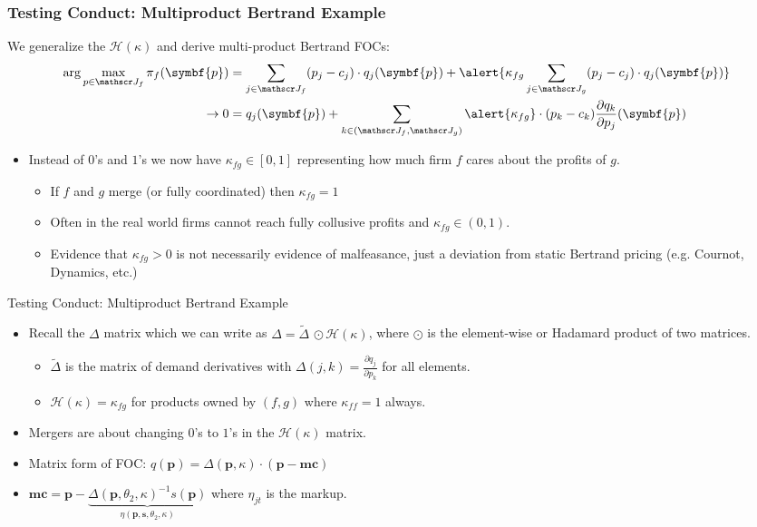 \documentclass[aspectratio=169,10pt]{beamer}
\begin{document}
\begin{frame}
\frametitle{Testing Conduct: Multiproduct Bertrand Example}
\small
We generalize the $\mathcal{H}(\kappa)$ and derive multi-product Bertrand FOCs:
\begin{align*}
\arg \max_{p \in \calJ_f} \pi_f (\symbf{p}) &= \sum_{j \in \calJ_f} (p_j - c_j) \cdot q_j(\symbf{p}) +  \alert{\kappa_{fg} \sum_{j \in \calJ_g} (p_j - c_j) \cdot q_j(\symbf{p})} \\
\rightarrow 0&= q_j(\symbf{p}) + \sum_{k \in (\calJ_f,\calJ_g)} \alert{\kappa_{fg}}\cdot (p_k - c_k) \frac{\partial q_{k}}{\partial p_j}(\symbf{p}) 
\end{align*}
\begin{itemize}
\item Instead of $0$'s and $1$'s we now have $\kappa_{fg} \in [0,1]$ representing how much firm $f$ cares about the profits of $g$.
\begin{itemize}
\item If $f$ and $g$ merge (or fully coordinated) then $\kappa_{fg} =1$
\item Often in the real world firms cannot reach fully collusive profits and $\kappa_{fg} \in (0,1)$.
\item Evidence that $\kappa_{fg} > 0$ is not necessarily evidence of malfeasance, just a deviation from \alert{static Bertrand pricing} (e.g. Cournot, Dynamics, etc.)
\end{itemize}
\end{itemize}
\end{frame}


\begin{frame}{Testing Conduct: Multiproduct Bertrand Example}
\begin{itemize}
\item Recall the $\Delta$ matrix which we can write as $\Delta=\tilde{\Delta}\, \odot \mathcal{H}(\kappa)$, where $\odot$ is the element-wise or Hadamard product of two matrices. 
\begin{itemize}
\item $\tilde{\Delta}$ is the matrix of demand derivatives with $\Delta{(j,k)} = \frac{\partial q_j}{\partial p_k}$ for all elements.
\item $\mathcal{H}(\kappa)=\kappa_{fg}$ for products owned by $(f,g)$ where $\kappa_{ff}=1$ always.
\end{itemize}
\item Mergers are about changing $0$'s to $1$'s in the $\mathcal{H}(\kappa)$ matrix.
\item Matrix form of FOC: $q(\symbf{p}) = \Delta(\symbf{p},\kappa)\cdot(\symbf{p}-\symbf{mc})$
\item $\symbf{mc} =  \symbf{p} - \underbrace{\Delta(\symbf{p}, \theta_2, \kappa)^{-1} s(\symbf{p})}_{\eta(\symbf{p},\symbf{s},\theta_2,\kappa)}$
where $\eta_{jt}$ is the markup.
\end{itemize}
\end{frame}
\end{document}
